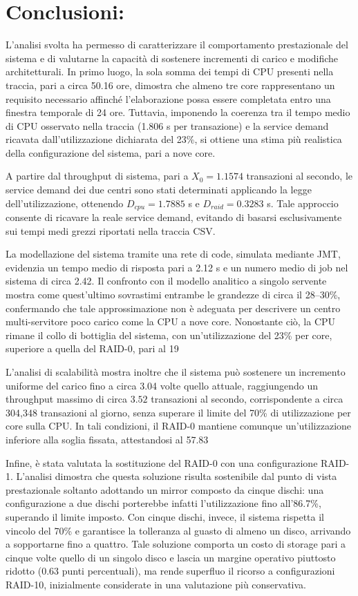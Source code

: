 \documentclass[11pt,a4paper]{article}
\begin{document}
\section{Conclusioni:}

L'analisi svolta ha permesso di caratterizzare il comportamento prestazionale del sistema e di valutarne la capacità di sostenere incrementi di carico e modifiche architetturali. In primo luogo, la sola somma dei tempi di CPU presenti nella traccia, pari a circa 50.16 ore, dimostra che almeno tre core rappresentano un requisito necessario affinché l'elaborazione possa essere completata entro una finestra temporale di 24 ore. Tuttavia, imponendo la coerenza tra il tempo medio di CPU osservato nella traccia (1.806 s per transazione) e la service demand ricavata dall'utilizzazione dichiarata del 23\%, si ottiene una stima più realistica della configurazione del sistema, pari a nove core.

A partire dal throughput di sistema, pari a $X_0 = 1.1574$ transazioni al secondo, le service demand dei due centri sono stati determinati applicando la legge dell'utilizzazione, ottenendo $D_{cpu}=1.7885$ s e $D_{raid}=0.3283$ s. Tale approccio consente di ricavare la reale service demand, evitando di basarsi esclusivamente sui tempi medi grezzi riportati nella traccia CSV.

La modellazione del sistema tramite una rete di code, simulata mediante JMT, evidenzia un tempo medio di risposta pari a 2.12 s e un numero medio di job nel sistema di circa 2.42. Il confronto con il modello analitico a singolo servente mostra come quest'ultimo sovrastimi entrambe le grandezze di circa il 28--30\%, confermando che tale approssimazione non è adeguata per descrivere un centro multi-servitore poco carico come la CPU a nove core. Nonostante ciò, la CPU rimane il collo di bottiglia del sistema, con un'utilizzazione del 23\% per core, superiore a quella del RAID-0, pari al 19%

L'analisi di scalabilità mostra inoltre che il sistema può sostenere un incremento uniforme del carico fino a circa 3.04 volte quello attuale, raggiungendo un throughput massimo di circa $3.52$ transazioni al secondo, corrispondente a circa 304,348 transazioni al giorno, senza superare il limite del 70\% di utilizzazione per core sulla CPU. In tali condizioni, il RAID-0 mantiene comunque un'utilizzazione inferiore alla soglia fissata, attestandosi al 57.83%

Infine, è stata valutata la sostituzione del RAID-0 con una configurazione RAID-1. L'analisi dimostra che questa soluzione risulta sostenibile dal punto di vista prestazionale soltanto adottando un mirror composto da cinque dischi: una configurazione a due dischi porterebbe infatti l'utilizzazione fino all'86.7\%, superando il limite imposto. Con cinque dischi, invece, il sistema rispetta il vincolo del 70\% e garantisce la tolleranza al guasto di almeno un disco, arrivando a sopportarne fino a quattro. Tale soluzione comporta un costo di storage pari a cinque volte quello di un singolo disco e lascia un margine operativo piuttosto ridotto (0.63 punti percentuali), ma rende superfluo il ricorso a configurazioni RAID-10, inizialmente considerate in una valutazione più conservativa.
\end{document}

